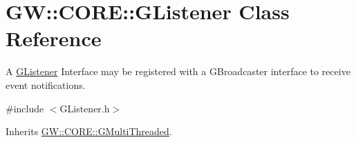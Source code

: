 \hypertarget{class_g_w_1_1_c_o_r_e_1_1_g_listener}{}\section{GW\+:\+:C\+O\+RE\+:\+:G\+Listener Class Reference}
\label{class_g_w_1_1_c_o_r_e_1_1_g_listener}


A \hyperlink{class_g_w_1_1_c_o_r_e_1_1_g_listener}{G\+Listener} Interface may be registered with a G\+Broadcaster interface to receive event notifications.  




{\ttfamily \#include $<$G\+Listener.\+h$>$}



Inherits \hyperlink{class_g_w_1_1_c_o_r_e_1_1_g_multi_threaded}{G\+W\+::\+C\+O\+R\+E\+::\+G\+Multi\+Threaded}.

